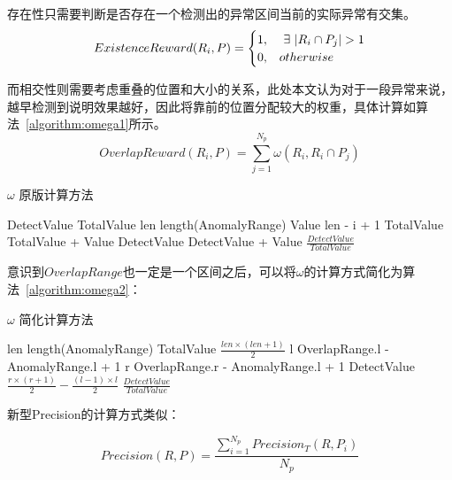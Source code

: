 存在性只需要判断是否存在一个检测出的异常区间当前的实际异常有交集。
\begin{equation*}
ExistenceReward(R_i,P) = \begin{cases} 1, & \ \exists \  | R_i \cap P_j|>1 \cr 0, & otherwise \end{cases}
\end{equation*}

而相交性则需要考虑重叠的位置和大小的关系，此处本文认为对于一段异常来说，越早检测到说明效果越好，因此将靠前的位置分配较大的权重，具体计算如算法~\ref{algorithm:omega1}所示。
\begin{equation*}
  OverlapReward(R_i,P) = \sum_{j=1}^{N_p}\omega(R_i,R_i\cap P_j)
\end{equation*}
\begin{algorithm}
  \caption{$\omega$ 原版计算方法\cite{tatbul2018precision}}
  \begin{algorithmic}
      \State DetectValue 
      \State TotalValue 
      \State len \gets length(AnomalyRange)
          \State Value \gets len - i + 1
          \State TotalValue \gets TotalValue + Value
              \State DetectValue \gets DetectValue + Value
          \EndIf
      \EndFor
      \State \Return $\frac{DetectValue}{TotalValue}$
      \EndFunction
  \end{algorithmic}
  \label{algorithm:omega1}
\end{algorithm}

意识到$OverlapRange$也一定是一个区间之后，可以将$\omega$的计算方式简化为算法~\ref{algorithm:omega2}：
  \begin{algorithm}
    \caption{$\omega$ 简化计算方法}
    \begin{algorithmic}
        \State len \gets length(AnomalyRange)
        \State TotalValue \gets $\frac{len \times (len + 1)}{2}$
        \State l \gets OverlapRange.l - AnomalyRange.l + 1
        \State r \gets OverlapRange.r - AnomalyRange.l + 1
        \State DetectValue \gets $\frac{r \times (r+1)}{2} - \frac{(l-1) \times l}{2}$
        \State \Return $\frac{DetectValue}{TotalValue}$
        \EndFunction
    \end{algorithmic}
    \label{algorithm:omega2}
  \end{algorithm}

新型Precision的计算方式类似：

\begin{equation*}
Precision(R,P) = \frac{\sum_{i=1}^{N_p}Precision_T(R,P_i)}{N_p}
\end{equation*}

